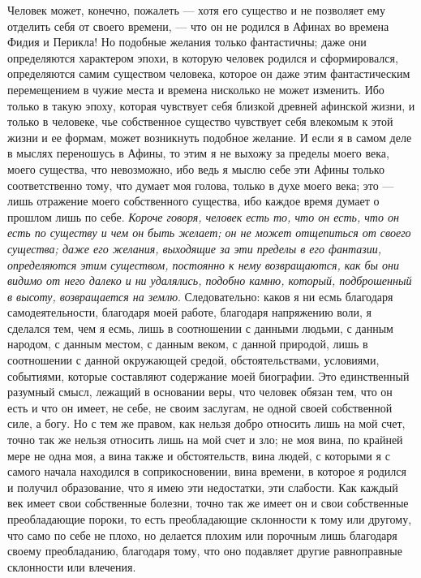 \documentclass[12pt]{article}
\begin{document}
Человек может, конечно, пожалеть --- хотя его существо и не позволяет ему отделить себя от своего времени, --- что он не родился в Афинах во времена Фидия и Перикла! Но подобные желания только фантастичны; даже они определяются характером эпохи, в которую человек родился и сформировался, определяются самим существом человека, которое он даже этим фантастическим перемещением в чужие места и времена нисколько не может изменить. Ибо только в такую эпоху, которая чувствует себя близкой древней афинской жизни, и только в человеке, чье собственное существо чувствует себя влекомым к этой жизни и ее формам, может возникнуть подобное желание. И если я в самом деле в мыслях переношусь в Афины, то этим я не выхожу за пределы моего века, моего существа, что невозможно, ибо ведь я мыслю себе эти Афины только соответственно тому, что думает моя голова, только в духе моего века; это --- лишь отражение моего собственного существа, ибо каждое время думает о прошлом лишь по себе. \emph{Короче говоря, человек есть то, что он есть, что он есть по существу и чем он быть желает; он не может отщепиться от своего существа; даже его желания, выходящие за эти пределы в его фантазии, определяются этим существом, постоянно к нему возвращаются, как бы они видимо от него далеко и ни удалялись, подобно камню, который, подброшенный в высоту, возвращается на землю}. Следовательно: каков я ни есмь благодаря самодеятельности, благодаря моей работе, благодаря напряжению воли, я сделался тем, чем я есмь, лишь в соотношении с данными людьми, с данным народом, с данным местом, с данным веком, с данной природой, лишь в соотношении с данной окружающей средой, обстоятельствами, условиями, событиями, которые составляют содержание моей биографии. Это единственный разумный смысл, лежащий в основании веры, что человек обязан тем, что он есть и что он имеет, не себе, не своим заслугам, не одной своей собственной силе, а богу. Но с тем же правом, как нельзя добро относить лишь на мой счет, точно так же нельзя относить лишь на мой счет и зло; не моя вина, по крайней мере не одна моя, а вина также и обстоятельств, вина людей, с которыми я с самого начала находился в соприкосновении, вина времени, в которое я родился и получил образование, что я имею эти недостатки, эти слабости. Как каждый век имеет свои собственные болезни, точно так же имеет он и свои собственные преобладающие пороки, то есть преобладающие склонности к тому или другому, что само по себе не плохо, но делается плохим или порочным лишь благодаря своему преобладанию, благодаря тому, что оно подавляет другие  равноправные склонности или влечения. 
\end{document}
